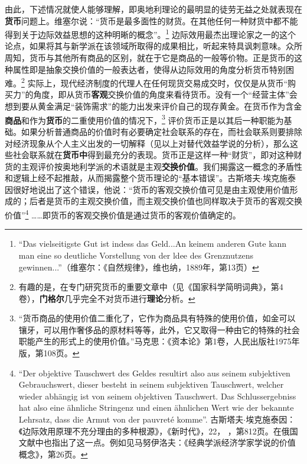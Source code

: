 \documentclass[fontset=fandol, a4paper, 12pt, openright]{ctexbook}
\newcommand{\RN}[1]{%
  \textup{\uppercase\expandafter{\romannumeral#1}}%
}
\begin{document}
由此，下述情况就使人能够理解，即奥地利理论的最明显的徒劳无益之处就表现在\textbf{货币}问题上。维塞尔说：“货币是最多面性的财货。在其他任何一种财货中都不能得到关于边际效益思想的这种明晰的概念”。\footnote{``Das vielseitigste Gut ist indess das Geld...An keinem anderen Gute kann man eine so deutliche Vorstellung von der ldee des Grenznutzens gewinnen...''（维塞尔：《自然规律》，维也纳，1889年，第13页）} 边际效用最杰出理论家之一的这个论点，如果将其与新学派在该领域所取得的成果相比，听起来特具讽刺意味。众所周知，货币与其他所有商品的区别，就在于它是商品的一般等价物。正是货币的这种属性即是抽象交换价值的一般表达者，使得从边际效用的角度分析货币特别困难。\footnote{有趣的是，在专门研究货币的重要文章中（见《国家科学简明词典》，第4卷），\textbf{门格尔}几乎完全不对货币进行\textbf{理论}分析。} 实际上，现代经济制度的代理人在任何现货交易成交时，仅仅是从货币“购买力”的角度，即从货币\textbf{客观}交换价值的角度来看待货币。没有一个“经营主体”会想到要从黄金满足“装饰需求”的能力出发来评价自己的现存黄金。在货币作为含金\textbf{商品}和作为\textbf{货币}的二重使用价值的情况下，\footnote{“货币商品的使用价值二重化了，它作为商品具有特殊的使用价值，如金可以镶牙，可以用作奢侈品的原材料等等，此外，它又取得一种由它的特殊的社会职能产生的形式上的使用价值。”马克思：《资本论》第1卷，人民出版社1975年版，第108页。} 评价货币正是以其后一种职能为基础。如果分析普通商品的价值时有必要确定社会联系的存在，而社会联系则要排除对经济现象从个人主义出发的一切解释（见以上对替代效益学说的分析），那么这些社会联系就在\textbf{货币中}得到最充分的表现。货币正是这样一种“财货”，即对这种财货的主观评价按奥地利学派的术语就是主观\textbf{交换价值}。我们揭露这一概念的矛盾性和逻辑上经不起推敲，从而揭露整个货币理论的“基本错误”。古斯塔夫$\cdot$埃克施泰因很好地说出了这个错误，他说：“货币的客观交换价值可见是由主观使用价值形成的；后者是货币的主观交换价值，而主观交换价值也同样取决于货币的客观交换价值”\footnote{``Der objektive Tauschwert des Geldes resultirt also aus seinem subjektiven Gebrauchswert, dieser besteht in seinem subjektiven Tauschwert, welcher wieder abh\"{a}ngig ist von seinem objektiven Tauschwert. Das Schlussergebniss hat also eine \"{a}hnliche Stringenz und einen \"{a}hnlichen Wert wie der bekannte Lehrsatz, dass die Armut von der pauvret\'{e} komme''. 古斯塔夫$\cdot$埃克施泰因：《边际效用原理不充分理由的多种根源》，《新时代》，22，\RN{2}，第812页。在俄国文献中也指出了这一点。例如见马努伊洛夫：《经典学派经济学家学说的价值概念》，第26页。} ……即货币的客观交换价值是通过货币的客观价值确定的。
\end{document}
